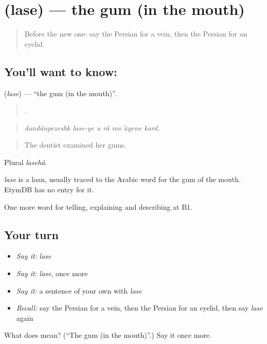 \section[\texorpdfstring{\fa{لثه} (lase)}{لثه (lase)}]{ (lase) — the gum (in the mouth)}

\label{lesson:FA-C496-lase}



\begin{quote}
Before the new one: say the Persian for a vein, then the Persian for an eyelid.
\end{quote}

\subsection*{You'll want to know: }
\textbf{} (\emph{lase}) — \textquotedblleft{}the gum (in the mouth)\textquotedblright{}.

\begin{quote}
     .
\end{quote}

\begin{quote}
\emph{dandânpezeshk lase-ye u râ mo'âyene kard.}
\end{quote}

\begin{quote}
The dentist examined her gums.
\end{quote}

Plural \emph{lasehâ}.

\begin{cousinweb}
\emph{lase} is a loan, usually traced to the Arabic word for the gum of the mouth. EtymDB has no entry for it.
\end{cousinweb}

\begin{grammarlens}[title={What you've built}]
One more word for telling, explaining and describing at B1.
\end{grammarlens}

\subsection*{Your turn}
\begin{itemize}
\raggedright
  \item \emph{Say it:} \emph{lase}
  \item \emph{Say it:} \emph{lase}, once more
  \item \emph{Say it:} a sentence of your own with \emph{lase}
  \item \emph{Recall:} say the Persian for a vein, then the Persian for an eyelid, then say \emph{lase} again
\end{itemize}

\begin{tcolorbox}[breakable,colback=teal!4,colframe=teal!35!black,title={Before you move on}]
What does  mean? (\textquotedblleft{}The gum (in the mouth)\textquotedblright{}.) Say it once more.
\end{tcolorbox}
